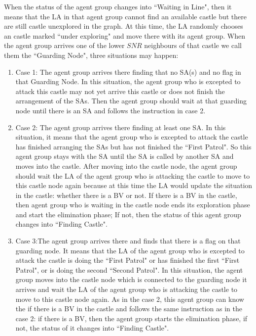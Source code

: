 When the status of the agent group changes into ``Waiting in Line", then it means that the  LA in that agent group cannot find an available castle but there are still castle unexplored in the graph. At this time, the LA  randomly chooses an  castle marked ``under exploring" and move there with its agent group. When the agent group arrives one of the lower $SNR$ neighbours of that castle we call them the ``Guarding Node", three situations may happen:
\begin{enumerate}
\item Case 1: The agent group arrives there finding that no SA(s) and no flag in that  Guarding Node. In this situation, the agent group who is excepted to attack this castle may not yet arrive this castle or does not finish the arrangement of the SAs. Then the agent group should wait at that guarding node until there is an SA and follows the instruction in case 2.

\item Case 2: The agent group arrives there finding at least one SA. In this situation, it means that the agent group who is excepted to attack the castle has finished arranging the SAs but has not finished the ``First Patrol". So this agent group stays with the SA until the SA is called by another SA and moves into the castle. After moving into the castle node, the agent group should wait the LA of the agent group who is attacking the castle to move to this castle node again because at this time the LA would update the situation in the castle: whether there is a BV or not. If there is a BV in the castle, then agent group who is waiting in the castle node ends its exploration phase and start the elimination phase; If not, then the status of this agent group changes into ``Finding Castle".

\item Case 3:The agent group arrives there and finds that there is a flag on that guarding node. It means that the LA of the agent group who is excepted to attack the castle is doing the ``First Patrol" or has finished the first ``First Patrol", or is doing the second ``Second Patrol". In this situation, the agent group moves into the castle node which is connected to the guarding node it arrives and wait the LA of the agent group who is attacking the castle to move to this castle node again. As in the case 2, this agent group can know the if there is a BV in the castle and follows the same instruction as in the case 2: if there is a BV, then the agent group starts the elimination phase, if not, the status of it changes into ``Finding Castle".

\end{enumerate}


